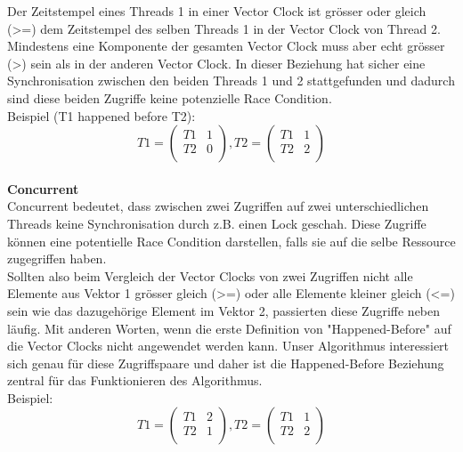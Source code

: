 \documentclass[10pt,a4paper]{article}
\begin{document}
\begin{flushleft}
Der Zeitstempel eines Threads 1 in einer Vector Clock ist grösser oder gleich (>=) dem Zeitstempel des selben Threads 1 in der Vector Clock von Thread 2. Mindestens eine Komponente der gesamten Vector Clock muss aber echt grösser (>) sein als in der anderen Vector Clock. In dieser Beziehung hat sicher eine Synchronisation zwischen den beiden Threads 1 und 2 stattgefunden und dadurch sind diese beiden Zugriffe keine potenzielle Race Condition.\\
Beispiel (T1 happened before T2):\\
\[
	T1 = \begin{pmatrix}
		T1 & 1\\
		T2 & 0\\
	\end{pmatrix}
	, T2 = \begin{pmatrix}
		T1 & 1\\
		T2 & 2\\
	\end{pmatrix}
\]
\\[0.5cm]
\textbf{Concurrent}\\[0.2cm]
Concurrent bedeutet, dass zwischen zwei Zugriffen auf zwei unterschiedlichen Threads keine Synchronisation durch z.B. einen Lock geschah. Diese Zugriffe können eine potentielle Race Condition darstellen, falls sie auf die selbe Ressource zugegriffen haben.\\
Sollten also beim Vergleich der Vector Clocks von zwei Zugriffen nicht alle Elemente aus Vektor 1 grösser gleich (>=) oder alle Elemente kleiner gleich (<=) sein wie das dazugehörige Element im Vektor 2, passierten diese Zugriffe neben läufig. Mit anderen Worten, wenn die erste Definition von "Happened-Before" auf die Vector Clocks nicht angewendet werden kann. Unser Algorithmus interessiert sich genau für diese Zugriffspaare und daher ist die Happened-Before Beziehung zentral für das Funktionieren des Algorithmus. \\
Beispiel:\\
\[
	T1 = \begin{pmatrix}
		T1 & 2\\
		T2 & 1\\
	\end{pmatrix}
	, T2 = \begin{pmatrix}
		T1 & 1\\
		T2 & 2\\
	\end{pmatrix}
\]
\\[0.5cm]
\end{flushleft}
\end{document}
